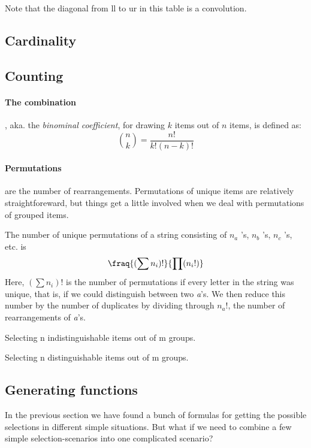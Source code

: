 Note that the diagonal from ll to ur in this table is a convolution. 

\subsection{Cardinality}


\subsection{Counting}

\paragraph{The combination}, aka. the \emph{binominal coefficient}, for drawing $k$ items out of $n$ items,  is defined as: 
$$ \binom{n}{k} = \frac{ n! }{ k!(n-k)! }$$

\paragraph{Permutations} are the number of rearrangements. Permutations of unique items are relatively straightforeward, but things get a little involved when we deal with permutations of grouped items. 

The number of unique permutations of a string consisting of $n_a$ 's, $n_b$ 's, $n_c$ 's, etc. is 
$$ \fraq{( \sum n_i )!}{\prod (n_i !)} $$
Here, $( \sum n_i )! $ is the number of permutations if every letter in the string was unique, that is, if we could distinguish between two \emph{a}'s. We then reduce this number by the number of duplicates by dividing through $n_a !$, the number of rearrangements of \emph{a}'s.



Selecting n indistinguishable items out of m groups.

Selecting n distinguishable items out of m groups.


\subsection{Generating functions}

In the previous section we have found a bunch of formulas for getting the possible selections in different simple situations. But what if we need to combine a few simple selection-scenarios into one complicated scenario? 

